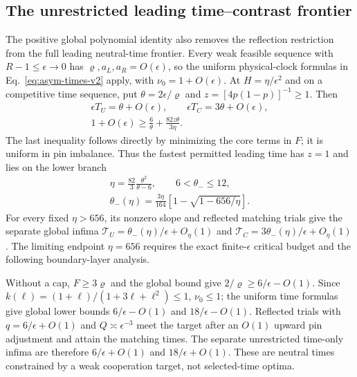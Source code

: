 \documentclass[aps,pre,reprint,amsmath,amssymb,longbibliography]{revtex4-2}
\begin{document}
\subsection{The unrestricted leading time--contrast frontier}
\label{v3-app-global-time-frontier}

The positive global polynomial identity also removes the reflection restriction
from the full leading neutral-time frontier. Every weak feasible sequence
with $R-1\leq\epsilon\to0$ has
$\varrho,a_L,a_R=O(\epsilon)$, so the uniform physical-clock formulas
in Eq.~\eqref{eq:asym-times-v2} apply, with
$\nu_0=1+O(\epsilon)$. At $H=\eta/\epsilon^2$ and on a competitive
time sequence, put $\theta=2\epsilon/\varrho$ and
$z=[4p(1-p)]^{-1}\geq1$. Then
\begin{equation}
 \begin{gathered}
 \epsilon T_U=\theta+O(\epsilon),\qquad
 \epsilon T_C=3\theta+O(\epsilon),\\
 1+O(\epsilon)\geq\frac6\theta+\frac{82z\theta}{3\eta}.
 \end{gathered}
 \label{v3-eq-unrestricted-time-constraint}
\end{equation}
The last inequality follows directly by minimizing the core terms in $F$;
it is uniform in pin imbalance. Thus the fastest permitted leading time
has $z=1$ and lies on the lower branch
\begin{equation}
 \begin{gathered}
 \eta=\frac{82}{3}\frac{\theta^2}{\theta-6},\qquad 6<\theta_-\le12,\\
 \theta_-(\eta)=\frac{3\eta}{164}
          \left[1-\sqrt{1-656/\eta}\right].
 \end{gathered}
 \label{v3-eq-unrestricted-time-frontier}
\end{equation}
For every fixed $\eta>656$, its nonzero slope and reflected matching trials
give the separate global infima
$\mathcal T_U=\theta_-(\eta)/\epsilon+O_\eta(1)$ and
$\mathcal T_C=3\theta_-(\eta)/\epsilon+O_\eta(1)$.
The limiting endpoint $\eta=656$ requires the exact finite-$\epsilon$
critical budget and the following boundary-layer analysis.

Without a cap, $F\geq3\varrho$ and the global bound give
$2/\varrho\geq6/\epsilon-O(1)$. Since
$k(\ell)=(1+\ell)/(1+3\ell+\ell^2)\leq1$, $\nu_0\leq1$;
the uniform time formulas give global lower bounds
$6/\epsilon-O(1)$ and $18/\epsilon-O(1)$.
Reflected trials with $q=6/\epsilon+O(1)$ and
$Q\asymp\epsilon^{-3}$ meet the target after an $O(1)$ upward pin
adjustment and attain the matching times. The separate unrestricted
time-only infima are therefore $6/\epsilon+O(1)$ and
$18/\epsilon+O(1)$. These are neutral times constrained by a weak
cooperation target, not selected-time optima.
\end{document}
